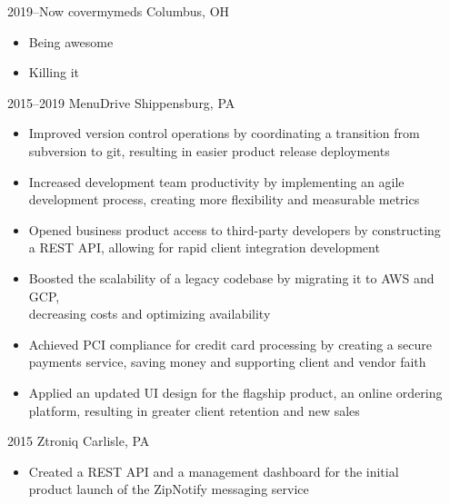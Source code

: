 \documentclass[]{cv-style}          %
\begin{document}
\begin{entrylist}
\entry
  {2019--Now}
  {covermymeds}
  {Columbus, OH}
  {
  \begin{itemize}
    \item Being awesome
    {\vspace{0.2cm}}
    \item Killing it
  \end{itemize}}
\entry
  {2015--2019}
  {MenuDrive}
  {Shippensburg, PA}
  {
  \begin{itemize}
    \item Improved version control operations by coordinating a transition from \\
    subversion to git, resulting in easier product release deployments
    {\vspace{0.2cm}}
    \item Increased development team productivity by implementing
    an agile \\
    development process, creating more flexibility and measurable metrics
    {\vspace{0.2cm}}
    \item Opened business product access to third-party developers by constructing \\
    a REST API, allowing for rapid client integration development
    {\vspace{0.2cm}}
    \item Boosted the scalability of a legacy codebase by migrating it to AWS and GCP, \\
    decreasing costs and optimizing availability
    {\vspace{0.2cm}}
    \item Achieved PCI compliance for credit card processing by
    creating a secure \\
    payments service, saving money and supporting client and vendor faith
    {\vspace{0.2cm}}
    \item Applied an updated UI design for the flagship product, an online ordering \\
    platform, resulting in greater client retention and new sales
    {\vspace{0.2cm}}
  \end{itemize}}
\entry
  {2015}
  {Ztroniq}
  {Carlisle, PA}
  {
  \begin{itemize}
    \item Created a REST API and a management dashboard for the initial \\
    product launch of the ZipNotify messaging service
  \end{itemize}}
\end{entrylist}
\end{document}
